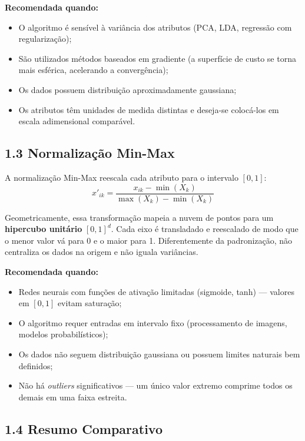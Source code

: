\documentclass[12pt,a4paper]{article}
\begin{document}
\textbf{Recomendada quando:}
\begin{itemize}[nosep]
    \item O algoritmo é sensível à variância dos atributos (PCA, LDA, regressão com regularização);
    \item São utilizados métodos baseados em gradiente (a superfície de custo se torna mais esférica, acelerando a convergência);
    \item Os dados possuem distribuição aproximadamente gaussiana;
    \item Os atributos têm unidades de medida distintas e deseja-se colocá-los em escala adimensional comparável.
\end{itemize}

\subsection*{1.3 Normalização Min-Max}

A normalização Min-Max reescala cada atributo para o intervalo $[0, 1]$:
%
\begin{equation}
    x'_{ik} = \frac{x_{ik} - \min(X_k)}{\max(X_k) - \min(X_k)}
\end{equation}

Geometricamente, essa transformação mapeia a nuvem de pontos para um \textbf{hipercubo unitário} $[0,1]^d$. Cada eixo é transladado e reescalado de modo que o menor valor vá para 0 e o maior para 1. Diferentemente da padronização, não centraliza os dados na origem e não iguala variâncias.

\textbf{Recomendada quando:}
\begin{itemize}[nosep]
    \item Redes neurais com funções de ativação limitadas (sigmoide, tanh) --- valores em $[0,1]$ evitam saturação;
    \item O algoritmo requer entradas em intervalo fixo (processamento de imagens, modelos probabilísticos);
    \item Os dados não seguem distribuição gaussiana ou possuem limites naturais bem definidos;
    \item Não há \textit{outliers} significativos --- um único valor extremo comprime todos os demais em uma faixa estreita.
\end{itemize}

\subsection*{1.4 Resumo Comparativo}
\end{document}
